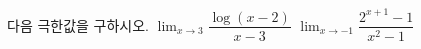 다음 극한값을 구하시오.
 $\displaystyle\lim_{x\to 3}\dfrac{\log(x-2)}{x-3}$
 $\displaystyle\lim_{x\to -1}\dfrac{2^{x+1}-1}{x^2-1}$
